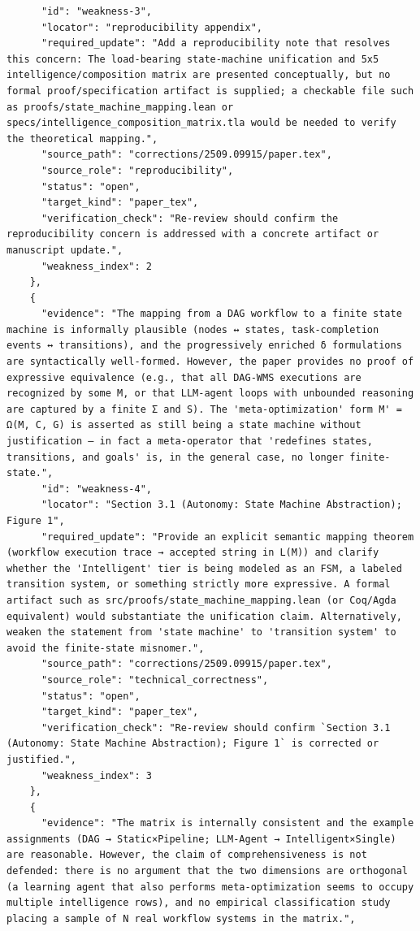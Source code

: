 \documentclass[11pt]{article}
\begin{document}
\begin{verbatim}
      "id": "weakness-3",
      "locator": "reproducibility appendix",
      "required_update": "Add a reproducibility note that resolves this concern: The load-bearing state-machine unification and 5x5 intelligence/composition matrix are presented conceptually, but no formal proof/specification artifact is supplied; a checkable file such as proofs/state_machine_mapping.lean or specs/intelligence_composition_matrix.tla would be needed to verify the theoretical mapping.",
      "source_path": "corrections/2509.09915/paper.tex",
      "source_role": "reproducibility",
      "status": "open",
      "target_kind": "paper_tex",
      "verification_check": "Re-review should confirm the reproducibility concern is addressed with a concrete artifact or manuscript update.",
      "weakness_index": 2
    },
    {
      "evidence": "The mapping from a DAG workflow to a finite state machine is informally plausible (nodes ↔ states, task-completion events ↔ transitions), and the progressively enriched δ formulations are syntactically well-formed. However, the paper provides no proof of expressive equivalence (e.g., that all DAG-WMS executions are recognized by some M, or that LLM-agent loops with unbounded reasoning are captured by a finite Σ and S). The 'meta-optimization' form M' = Ω(M, C, G) is asserted as still being a state machine without justification — in fact a meta-operator that 'redefines states, transitions, and goals' is, in the general case, no longer finite-state.",
      "id": "weakness-4",
      "locator": "Section 3.1 (Autonomy: State Machine Abstraction); Figure 1",
      "required_update": "Provide an explicit semantic mapping theorem (workflow execution trace → accepted string in L(M)) and clarify whether the 'Intelligent' tier is being modeled as an FSM, a labeled transition system, or something strictly more expressive. A formal artifact such as src/proofs/state_machine_mapping.lean (or Coq/Agda equivalent) would substantiate the unification claim. Alternatively, weaken the statement from 'state machine' to 'transition system' to avoid the finite-state misnomer.",
      "source_path": "corrections/2509.09915/paper.tex",
      "source_role": "technical_correctness",
      "status": "open",
      "target_kind": "paper_tex",
      "verification_check": "Re-review should confirm `Section 3.1 (Autonomy: State Machine Abstraction); Figure 1` is corrected or justified.",
      "weakness_index": 3
    },
    {
      "evidence": "The matrix is internally consistent and the example assignments (DAG → Static×Pipeline; LLM-Agent → Intelligent×Single) are reasonable. However, the claim of comprehensiveness is not defended: there is no argument that the two dimensions are orthogonal (a learning agent that also performs meta-optimization seems to occupy multiple intelligence rows), and no empirical classification study placing a sample of N real workflow systems in the matrix.",

\end{verbatim}
\end{document}
